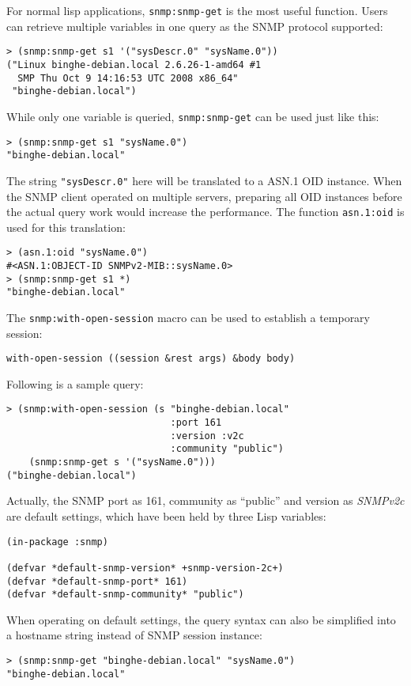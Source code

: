\documentclass[reprint,9pt]{sigplanconf}
\begin{document}
For normal lisp applications, \texttt{snmp:snmp-get} is the most
useful function. Users can retrieve multiple variables in one query as
the SNMP protocol supported:
%
\begin{verbatim}
> (snmp:snmp-get s1 '("sysDescr.0" "sysName.0"))
("Linux binghe-debian.local 2.6.26-1-amd64 #1
  SMP Thu Oct 9 14:16:53 UTC 2008 x86_64"
 "binghe-debian.local")
\end{verbatim}
%
While only one variable is queried, \texttt{snmp:snmp-get} can be used
just like this:
%
\begin{verbatim}
> (snmp:snmp-get s1 "sysName.0")
"binghe-debian.local"
\end{verbatim}

The string \texttt{"sysDescr.0"} here will be translated to a
ASN.1 OID instance. When the SNMP client operated on
multiple servers, preparing all OID instances before the actual query work
would increase the performance. The function \texttt{asn.1:oid} is used for
this translation:
%
\begin{verbatim}
> (asn.1:oid "sysName.0")
#<ASN.1:OBJECT-ID SNMPv2-MIB::sysName.0>
> (snmp:snmp-get s1 *)
"binghe-debian.local"
\end{verbatim}

The \texttt{snmp:with-open-session} macro can be used to establish a
temporary session:
\begin{verbatim}
with-open-session ((session &rest args) &body body)
\end{verbatim}
Following is a sample query:
\begin{verbatim}
> (snmp:with-open-session (s "binghe-debian.local"
                             :port 161
                             :version :v2c
                             :community "public")
    (snmp:snmp-get s '("sysName.0")))
("binghe-debian.local")
\end{verbatim}
Actually, the SNMP port as 161, community as ``public'' and version as
\textsl{SNMPv2c} are default settings, which have been held by three
Lisp variables:
%
\begin{verbatim}
(in-package :snmp)

(defvar *default-snmp-version* +snmp-version-2c+)
(defvar *default-snmp-port* 161)
(defvar *default-snmp-community* "public")
\end{verbatim}

When operating on default settings, the query syntax can also be
simplified into a hostname string instead of SNMP session instance:
%
\begin{verbatim}
> (snmp:snmp-get "binghe-debian.local" "sysName.0")
"binghe-debian.local"
\end{verbatim}
\end{document}
